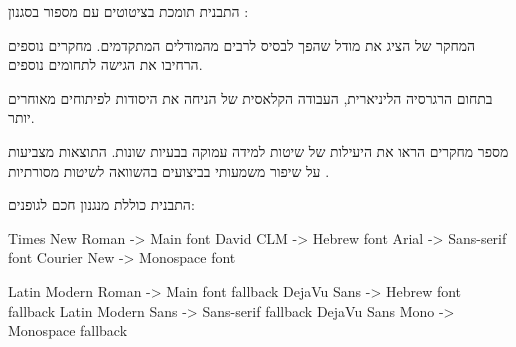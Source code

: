 \documentclass{hebrew-academic-template}
\begin{document}
התבנית תומכת בציטוטים עם מספור  בסגנון :

המחקר של  \cite{mikolov2013} הציג את מודל  שהפך לבסיס לרבים מהמודלים המתקדמים. מחקרים נוספים \cite{kingma2013,goodfellow2014} הרחיבו את הגישה לתחומים נוספים.

בתחום הרגרסיה הליניארית, העבודה הקלאסית של  \cite{galton1886} הניחה את היסודות לפיתוחים מאוחרים יותר.


מספר מחקרים \cite{mikolov2013,kingma2013,goodfellow2014} הראו את היעילות של שיטות למידה עמוקה בבעיות שונות. התוצאות מצביעות על שיפור משמעותי בביצועים בהשוואה לשיטות מסורתיות \cite{galton1886}.




התבנית כוללת מנגנון  חכם לגופנים:

\begin{pythonbox}
Times New Roman    -> Main font
David CLM         -> Hebrew font  
Arial             -> Sans-serif font
Courier New       -> Monospace font

Latin Modern Roman -> Main font fallback
DejaVu Sans       -> Hebrew font fallback
Latin Modern Sans -> Sans-serif fallback
DejaVu Sans Mono  -> Monospace fallback
\end{pythonbox}


\begin{pythonbox}



\end{pythonbox}


\end{document}
